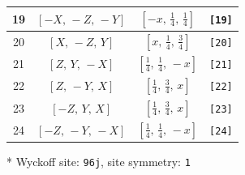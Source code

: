 \documentclass[fleqn,8pt]{jsarticle}
\begin{document}
\begin{longtable}{cccc}
19 & $\left[ - X,\, - Z,\, - Y \right]$ & $\left[ - x,\, \frac{1}{4},\, \frac{1}{4} \right]$ & {\tt [19]} \\ \hline
20 & $\left[ X,\, - Z,\, Y \right]$ & $\left[ x,\, \frac{1}{4},\, \frac{3}{4} \right]$ & {\tt [20]} \\ \hline
21 & $\left[ Z,\, Y,\, - X \right]$ & $\left[ \frac{1}{4},\, \frac{1}{4},\, - x \right]$ & {\tt [21]} \\ \hline
22 & $\left[ Z,\, - Y,\, X \right]$ & $\left[ \frac{1}{4},\, \frac{3}{4},\, x \right]$ & {\tt [22]} \\ \hline
23 & $\left[ - Z,\, Y,\, X \right]$ & $\left[ \frac{1}{4},\, \frac{3}{4},\, x \right]$ & {\tt [23]} \\ \hline
24 & $\left[ - Z,\, - Y,\, - X \right]$ & $\left[ \frac{1}{4},\, \frac{1}{4},\, - x \right]$ & {\tt [24]} \\
\end{longtable}
* Wyckoff site: {\tt 96j}, site symmetry: {\tt 1}
\renewcommand{\arraystretch}{1.2}
\end{document}

